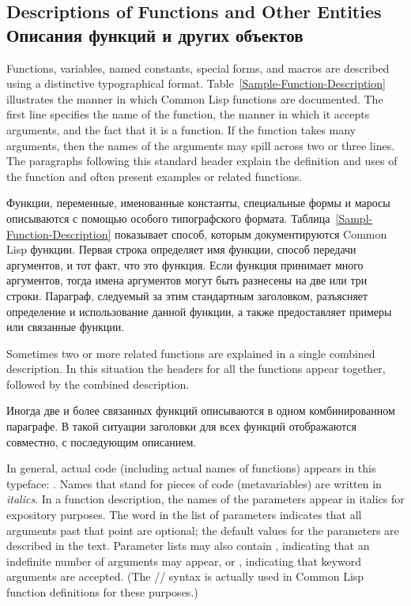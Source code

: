 \subsection{Descriptions of Functions and Other Entities Описания функций и
других объектов}
\label{FUNCTION-HEADER-NOTATION-SECTION}

Functions, variables, named constants, special forms, and macros are described
using a distinctive typographical format.
Table~\ref{Sample-Function-Description} illustrates the manner
in which Common Lisp functions are documented.
The first line specifies the name of the function,
the manner in which it accepts arguments,
and the fact that it is a function.
If the function takes many arguments, then the names of the arguments
may spill across two or three lines.
The paragraphs following this standard header
explain the definition and uses of the function and often
present examples or related functions.

Функции, переменные, именованные константы, специальные формы и маросы
описываются с помощью особого типографского формата.
Таблица~\ref{Sampl-Function-Description} показывает способ, которым
документируются Common Lisp функции.
Первая строка определяет имя функции, способ передачи аргументов, и тот факт,
что это функция.
Если функция принимает много аргументов, тогда имена аргументов могут быть
разнесены на две или три строки.
Параграф, следуемый за этим стандартным заголовком, разъясняет определение и
использование данной функции, а также предоставляет примеры или связанные
функции.

Sometimes two or more related functions are explained in a single
combined description.  In this situation the headers for all the
functions appear together, followed by the combined description.

Иногда две и более связанных функций описываются в одном комбинированном
параграфе. В такой ситуации заголовки для всех функций отображаются совместно, с
последующим описанием.

In general, actual code (including actual names of functions)
appears in this typeface: .
Names that stand for pieces of code (metavariables) are written in
\textit{italics}.  In a function description, the names of the parameters appear
in italics for expository purposes.  The word  in the
list of parameters indicates that all arguments past that point are
optional; the default values for the parameters are described in the
text.  Parameter lists may also contain , indicating that an
indefinite number of arguments may appear, or , indicating
that keyword arguments are accepted.
(The //
syntax is actually used in Common Lisp function definitions for these purposes.)

